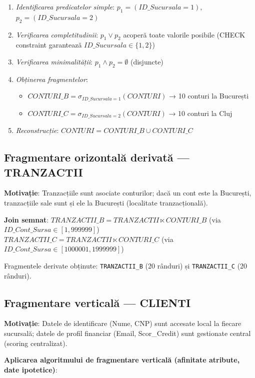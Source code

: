 \documentclass[12pt,a4paper]{article}
\begin{document}
\begin{enumerate}
  \item \textit{Identificarea predicatelor simple}: $p_1 = (ID\_Sucursala = 1)$, $p_2 = (ID\_Sucursala = 2)$
  \item \textit{Verificarea completitudinii}: $p_1 \lor p_2$ acoperă toate valorile posibile (CHECK constraint garantează $ID\_Sucursala \in \{1,2\}$)
  \item \textit{Verificarea minimalității}: $p_1 \land p_2 = \emptyset$ (disjuncte)
  \item \textit{Obținerea fragmentelor}:
    \begin{itemize}
      \item $CONTURI\_B = \sigma_{ID\_Sucursala=1}(CONTURI)$ → 10 conturi la București
      \item $CONTURI\_C = \sigma_{ID\_Sucursala=2}(CONTURI)$ → 10 conturi la Cluj
    \end{itemize}
  \item \textit{Reconstrucție}: $CONTURI = CONTURI\_B \cup CONTURI\_C$
\end{enumerate}

\subsection{Fragmentare orizontală derivată — TRANZACTII}

\textbf{Motivație}: Tranzacțiile sunt asociate conturilor; dacă un cont este la București,
tranzacțiile sale sunt și ele la București (localitate tranzacțională).

\textbf{Join semnat}:
$TRANZACTII\_B = TRANZACTII \ltimes CONTURI\_B$ (via $ID\_Cont\_Sursa \in [1, 999999]$)
$TRANZACTII\_C = TRANZACTII \ltimes CONTURI\_C$ (via $ID\_Cont\_Sursa \in [1000001, 1999999]$)

Fragmentele derivate obținute: \texttt{TRANZACTII\_B} (20 rânduri) și \texttt{TRANZACTII\_C} (20 rânduri).

\subsection{Fragmentare verticală — CLIENTI}

\textbf{Motivație}: Datele de identificare (Nume, CNP) sunt accesate local la fiecare sucursală;
datele de profil financiar (Email, Scor\_Credit) sunt gestionate central (scoring centralizat).

\textbf{Aplicarea algoritmului de fragmentare verticală (afinitate atribute, date ipotetice)}:
\end{document}
